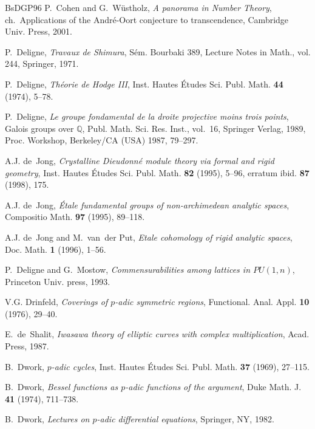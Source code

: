 \begin{thebibliography}{BsDGP96}
P.~Cohen and G.~W\"ustholz, \emph{A panorama in Number Theory},
  ch.~Applications of 
  the {A}ndr\'e-{O}ort conjecture to transcendence, Cambridge Univ. Press,
  2001.

P.~Deligne, \emph{Travaux de {S}himura}, S\'em. Bourbaki 389, Lecture Notes in
  Math., vol. 244, Springer, 1971.

P.~Deligne, \emph{Th\'eorie de {H}odge {I}{I}{I}}, Inst. Hautes {\'E}tudes Sci.
  Publ. Math. \textbf{44} (1974), 5--78.

P.~Deligne, \emph{Le groupe fondamental de la droite projective moins trois
  points}, Galois groups over $\mathbb{Q}$, Publ. Math. Sci. Res. Inst.,
  vol.~16, Springer Verlag, 1989, Proc. Workshop, Berkeley/CA (USA) 1987,
  79--297.

A.J. de~Jong, \emph{Crystalline Dieudonn\'e module theory via formal and rigid
  geometry}, Inst. Hautes {\'E}tudes Sci. Publ. Math. \textbf{82} (1995),
  5--96, erratum ibid. {\bf 87} (1998), 175.

A.J. de~Jong, \emph{\'{E}tale fundamental groups of non-archimedean analytic
  spaces}, Compositio Math. \textbf{97} (1995), 89--118.

A.J. de~Jong and M.~van~der Put, \emph{Etale cohomology of rigid analytic
  spaces}, Doc. Math. \textbf{1} (1996), 1--56.

P.~Deligne and G.~Mostow, \emph{Commensurabilities among lattices in
  ${P}{U}(1,n)$}, Princeton Univ. press, 1993.

V.G. Drinfeld, \emph{Coverings of $p$-adic symmetric regions}, Functional.
  Anal. Appl. \textbf{10} (1976), 29--40.

E.~de~Shalit, \emph{Iwasawa theory of elliptic curves with complex
  multiplication}, Acad. Press, 1987.

B.~Dwork, \emph{$p$-adic cycles}, Inst. Hautes {\'E}tudes Sci. Publ. Math.
  \textbf{37} (1969), 27--115.

B.~Dwork, \emph{Bessel functions as $p$-adic functions of the argument}, Duke
  Math. J. \textbf{41} (1974), 711--738.

B.~Dwork, \emph{Lectures on $p$-adic differential equations}, Springer, NY,
  1982.


\end{thebibliography}
